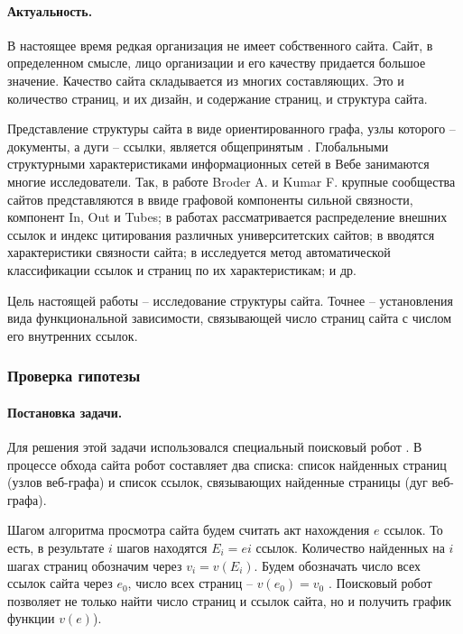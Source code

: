 \paragraph{Актуальность.} В настоящее время редкая организация не имеет собственного сайта. Сайт, в определенном смысле, лицо организации и его качеству придается большое значение. Качество сайта складывается из многих составляющих. Это и количество страниц, и их дизайн, и содержание страниц, и структура сайта.

Представление структуры сайта в виде ориентированного графа, узлы которого -- документы, а дуги -- ссылки, является общепринятым \cite{BroderKumarMaghoul}. Глобальными структурными характеристиками информационных сетей в Вебе занимаются многие исследователи. Так, в работе Broder A. и Kumar F. \cite{BroderKumarMaghoul} крупные сообщества сайтов представляются в ввиде графовой компоненты сильной связности, компонент In, Out и Tubes; в работах \cite{Thelwall,ThelwallZuccala,ThelwallWilkinsonMusgrove,PechnikovNwohiri} рассматривается распределение внешних ссылок и индекс цитирования различных университетских сайтов; в \cite{BlekanovSergeevMaksimovBOWTIE} вводятся характеристики связности сайта; в \cite{KenekayoroBuckleyThelwall} исследуется метод автоматической классификации ссылок и страниц по их характеристикам; и др.

Цель настоящей работы – исследование структуры сайта. Точнее – установления вида функциональной зависимости, связывающей число страниц сайта с числом его внутренних ссылок.

\subsubsection{Проверка гипотезы}

\paragraph{Постановка задачи.} Для решения этой задачи использовался специальный поисковый робот \cite{BlekanovSergeevMartynenko}. В процессе обхода сайта робот составляет два списка: список найденных страниц (узлов веб-графа) и список ссылок, связывающих найденные страницы (дуг веб-графа).

Шагом алгоритма просмотра сайта будем считать акт нахождения \(e\) ссылок. То есть, в результате \(i\) шагов находятся \(E_i = ei\) ссылок. Количество найденных на \(i\) шагах страниц обозначим через \(v_i = v(E_i)\). Будем обозначать число всех ссылок сайта через \(e_0\), число всех страниц -- \(v(e_0) = v_0\) . Поисковый робот позволяет не только найти число страниц и ссылок сайта, но и получить график функции \(v(e)\)).

